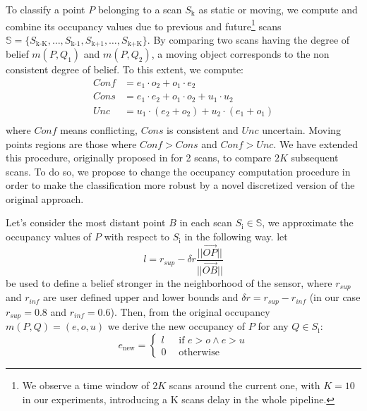 To classify a point $P$ belonging to a scan $S_{\text{k}}$ as static or moving, we compute and combine its occupancy values due to previous and future\footnote{We observe a time window of $2K$ scans around the current one, with $K=10$ in our experiments, introducing a K scans delay in the whole pipeline.} scans $\mathbb{S} = \{S_{\text{k-K}}, \dots, S_{\text{k-1}}, S_{\text{k+1}}, \dots, S_{\text{k+K}} \}$.
By comparing two scans having the degree of belief $m(P,Q_1)$ and $m(P,Q_2)$, a moving object corresponds to the non consistent degree of belief. To this extent, we compute:
\begin{equation}
 \begin{split}
  Conf &= e_1\cdot o_2 + o_1\cdot e_2\ \\
  Cons &= e_1\cdot e_2 + o_1\cdot o_2 + u_1\cdot u_2\ \\
  Unc\ &= u_1\cdot (e_2 + o_2) + u_2\cdot (e_1 + o_1)\\
 \end{split}
\end{equation}
where $Conf$ means conflicting, $Cons$ is consistent and $Unc$ uncertain. 
Moving points regions are those where $Conf > Cons$ and $Conf > Unc$. 
We have extended this procedure, originally proposed in \cite{xiao2013change} for 2 scans, to compare $2K$ subsequent scans.
To do so, we propose to change the occupancy computation procedure in order to make the classification more robust by a novel discretized version of the original approach. 

Let's consider the most distant point $B$ in each scan $S_{\text{i}} \in \mathbb{S}$, we approximate the occupancy values of $P$ with respect to $S_{\text{i}}$ in the following way. 
let 
\[
 l = r_{sup} - \delta r\frac{||\overrightarrow{OP}||}{||\overrightarrow{OB}||}
\] 
be used to define a belief stronger in the neighborhood of the sensor, where $r_{sup}$ and $r_{inf}$ are user defined upper and lower bounds and $\delta r = r_{sup} - r_{inf}$ (in our case  $r_{sup} = 0.8$ and $r_{inf} = 0.6$). 
Then, from the original occupancy $m(P,Q)=(e, o, u)$ we derive the new occupancy of $P$ for any $Q\in S_{\text{i}}$:
\begin{equation}
 e_{\text{new}} = \begin{cases}
      l\ \ \ &\mbox{if }e > o \wedge e > u \\
      0 &\mbox{otherwise}
     \end{cases}
\end{equation}

